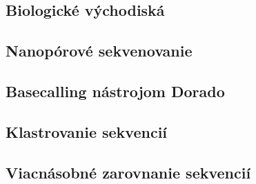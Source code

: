 \subsection{Biologické východiská}




\subsection{Nanopórové sekvenovanie}






\subsection{Basecalling nástrojom Dorado}


\subsection{Klastrovanie sekvencií}




\subsection{Viacnásobné zarovnanie sekvencií}







